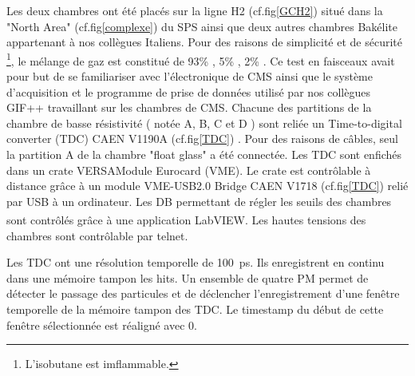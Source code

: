 Les deux chambres ont été placés sur la ligne H2 (cf.fig\ref{GCH2}) situé dans la "North Area" (cf.fig\ref{complexe}) du SPS ainsi que deux autres chambres Bakélite appartenant à nos collègues Italiens. Pour des raisons de simplicité et de sécurité \footnote{L'isobutane est imflammable.}, le mélange de gaz est constitué de 93\% , 5\% , 2\% . Ce test en faisceaux avait pour but de se familiariser avec l'électronique de CMS ainsi que le système d'acquisition et le programme de prise de données utilisé par nos collègues GIF++ travaillant sur les chambres de CMS. 
Chacune des partitions de la chambre de basse résistivité ( notée A, B, C et D ) sont reliée un Time-to-digital converter (TDC) CAEN V1190A (cf.fig\ref{TDC}) \cite{TDC}. Pour des raisons de câbles, seul la partition A de la chambre "float glass" a été connectée. Les TDC sont enfichés dans un crate VERSAModule Eurocard (VME). Le crate est contrôlable à distance grâce à un module VME-USB2.0 Bridge CAEN V1718 (cf.fig\ref{TDC}) \cite{VME} relié par USB à un ordinateur. Les DB permettant de régler les seuils des chambres sont contrôlés grâce à une application LabVIEW\textsuperscript{\textregistered}. Les hautes tensions des chambres sont contrôlable par telnet. 

Les TDC ont une résolution temporelle de \SI{100}{\pico\second}. Ils enregistrent en continu dans une mémoire tampon les hits. Un ensemble de quatre PM permet de détecter le passage des particules et de déclencher l'enregistrement d'une fenêtre temporelle de la mémoire tampon des TDC. Le timestamp du début de cette fenêtre sélectionnée est réaligné avec $0$.

